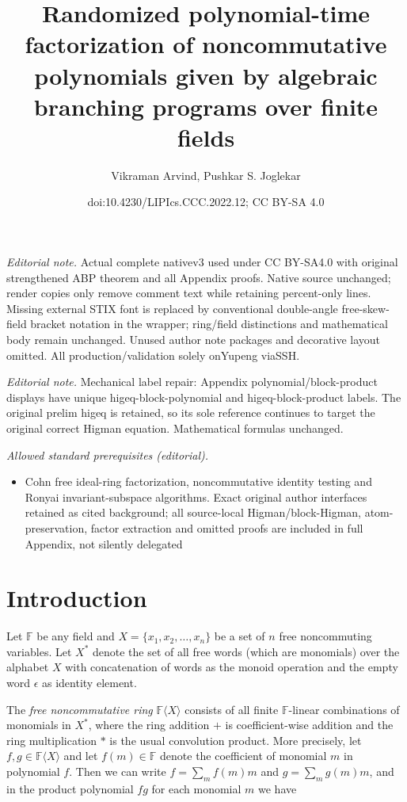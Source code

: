 \documentclass[10pt,a4paper]{article}
\title{Randomized polynomial-time factorization of noncommutative polynomials given by algebraic branching programs over finite fields}
\author{Vikraman Arvind, Pushkar S. Joglekar}
\date{doi:10.4230/LIPIcs.CCC.2022.12; CC BY-SA 4.0}
\newcommand{\F}{\mathbb{F}}
\renewcommand{\angle}[1]{\langle #1 \rangle}
\newcommand{\FX}{\F\angle{X}}
\begin{document}
\maketitle
\noindent\textit{Editorial note.} Actual complete nativev3 used under CC BY-SA4.0 with original strengthened ABP theorem and all Appendix proofs. Native source unchanged; render copies only remove comment text while retaining percent-only lines. Missing external STIX font is replaced by conventional double-angle free-skew-field bracket notation in the wrapper; ring/field distinctions and mathematical body remain unchanged. Unused author note packages and decorative layout omitted. All production/validation solely onYupeng viaSSH.\par\medskip
\noindent\textit{Editorial note.} Mechanical label repair: Appendix polynomial/block-product displays have unique higeq-block-polynomial and higeq-block-product labels. The original prelim higeq is retained, so its sole reference continues to target the original correct Higman equation. Mathematical formulas unchanged.\par\medskip
\noindent\textit{Allowed standard prerequisites (editorial).}\begin{itemize}
\item Cohn free ideal-ring factorization, noncommutative identity testing and Ronyai invariant-subspace algorithms. Exact original author interfaces retained as cited background; all source-local Higman/block-Higman, atom-preservation, factor extraction and omitted proofs are included in full Appendix, not silently delegated
\end{itemize}\medskip
\section{Introduction}\label{intro}

Let $\F$ be any field and $X=\{x_1,x_2,\ldots,x_n\}$ be a set of $n$
free noncommuting variables. Let $X^*$ denote the set of all free
words (which are monomials) over the alphabet $X$ with concatenation
of words as the monoid operation and the empty word $\epsilon$ as
identity element.

The \emph{free noncommutative ring} $\FX$ consists of all finite
$\F$-linear combinations of monomials in $X^*$, where the ring
addition $+$ is coefficient-wise addition and the ring multiplication
$*$ is the usual convolution product. More precisely, let $f,g\in\FX$
and let $f(m)\in\F$ denote the coefficient of monomial $m$ in
polynomial $f$. Then we can write $f=\sum_m f(m) m$ and $g=\sum_m g(m)
m$, and in the product polynomial $fg$ for each monomial $m$ we have
\end{document}
